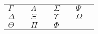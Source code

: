 \documentclass{article}
\newcommand*\s[1]{$#1$&\texttt{\string#1}}
\begin{document}
\thispagestyle{empty}
\begin{tabular}{l@{~}ll@{~}ll@{~}ll@{~}l}
\s\Gamma &\s\Lambda &\s\Sigma   &\s\Psi   \\
\s\Delta &\s\Xi     &\s\Upsilon &\s\Omega \\
\s\Theta &\s\Pi     &\s\Phi
\end{tabular}
\end{document}
